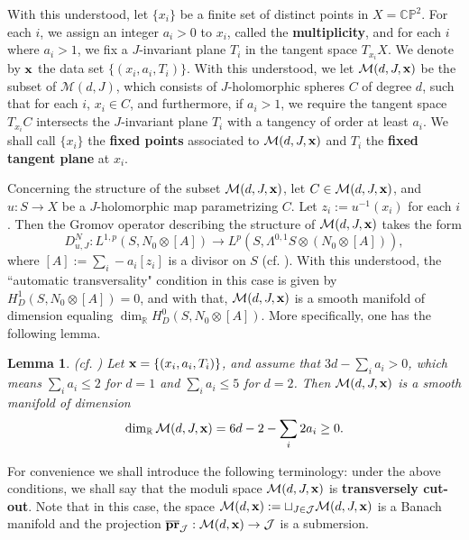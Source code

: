 \documentclass[11pt]{amsart}
\theoremstyle{plain}
\numberwithin{theorem}{section}
\newtheorem{lemma}[theorem]{Lemma}
\theoremstyle{definition}
\newcommand{\C}{{\mathbb C}}
\newcommand{\R}{{\mathbb R}}
\renewcommand{\P}{{\mathbb P}}
\newcommand{\J}{{\mathcal J}}
\newcommand{\M}{{\mathcal M}}
\begin{document}
With this understood, let $\{x_i\}$ be a finite set of distinct points in $X=\C\P^2$. For each $i$, we 
assign an integer $a_i>0$ to $x_i$, called the {\bf multiplicity}, and for each $i$ where $a_i>1$, we fix a $J$-invariant plane $T_i$ in the tangent space $T_{x_i} X$. We denote by ${\bf x}$ the data set
$\{(x_i,a_i,T_i)\}$. With this understood, we let $\M(d,J, {\bf x})$ be the subset of $\M(d,J)$, which consists of $J$-holomorphic spheres $C$ of degree $d$, such that for each $i$, $x_i\in C$, and furthermore, if $a_i>1$, we require the tangent space $T_{x_i} C$ intersects the $J$-invariant plane $T_i$ with a tangency of order at least $a_i$. We shall call $\{x_i\}$ the {\bf fixed points} associated to $\M(d,J, {\bf x})$ and $T_i$ the {\bf fixed tangent plane} at $x_i$.

Concerning the structure of the subset $\M(d,J, {\bf x})$, 
let $C\in \M(d,J, {\bf x})$, and $u: S\rightarrow X$ be a $J$-holomorphic map parametrizing $C$.
Let $z_i:=u^{-1}(x_i)$ for each $i$. Then the Gromov operator describing the structure of 
$\M(d,J, {\bf x})$ takes the form 
$$
D_{u,J}^N: L^{1,p}(S,N_0\otimes [A])\rightarrow L^p(S, \Lambda^{0,1}S \otimes (N_0\otimes [A])),
$$
where $[A]:=\sum_i -a_i [z_i]$ is a divisor on $S$ (cf. \cite{Bar, Shev}). With this understood, 
the ``automatic transversality" condition in this case is
given by $H^1_D(S, N_0\otimes [A])=0$, and with that, $\M(d,J, {\bf x})$ is a smooth manifold of dimension equaling $\dim_\R H^0_D (S, N_0\otimes [A])$. More specifically, one has the following lemma. 

\begin{lemma}
(cf. \cite{Shev})
Let ${\bf x}=\{(x_i,a_i,T_i)\}$, and assume that $3d-\sum_i a_i>0$, which means $\sum_i a_i\leq 2$ for $d=1$ 
and $\sum_i a_i\leq 5$ for $d=2$. Then $\M(d,J, {\bf x})$ is a smooth manifold of dimension 
$$
\dim_\R\M(d,J, {\bf x})= 6d-2-\sum_i 2a_i\geq 0.
$$
\end{lemma}
For convenience we shall introduce the following terminology: under the above conditions, we shall say that the moduli space $\M(d,J, {\bf x})$ is {\bf transversely cut-out}. Note that in this case, the space
$\M(d,{\bf x}):=\sqcup_{J\in\J} \M(d,J, {\bf x})$ is a Banach manifold and the projection 
$\overline{{\bf pr}}_\J:\M(d,{\bf x})\rightarrow \J$ is a submersion.

\vspace{2mm}
\end{document}
